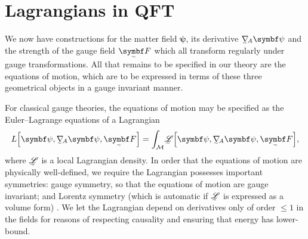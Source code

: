 






\section{Lagrangians in QFT}

We now have constructions for the matter field $\bm\psi$, its derivative $\ts\nabla_{\!A}\bm\psi$ and the strength of the gauge field $\tsbm F$ which all transform regularly under gauge transformations.
All that remains to be specified in our theory are the equations of motion, which are to be expressed in terms of these three geometrical objects in a gauge invariant manner.

For classical gauge theories, the equations of motion may be specified as the Euler--Lagrange equations of a Lagrangian
\begin{align}
	L\qty[\bm\psi, \ts\nabla_{\!A}\bm\psi, \tsbm F] = \int_{\cal M}\! \LL\qty[\bm\psi, \ts\nabla_{\!A}\bm\psi, \tsbm F]
,\end{align}
where $\LL$ is a local Lagrangian density.
In order that the equations of motion are physically well-defined, we require the Lagrangian possesses important symmetries: gauge symmetry, so that the equations of motion are gauge invariant; and Lorentz symmetry (which is automatic if $\LL$ is expressed as a volume form) \cite[§~7.1]{Hamilton_2017}.
We let the Lagrangian depend on derivatives only of order $\le 1$ in the fields for reasons of respecting causality and ensuring that energy has lower-bound.

